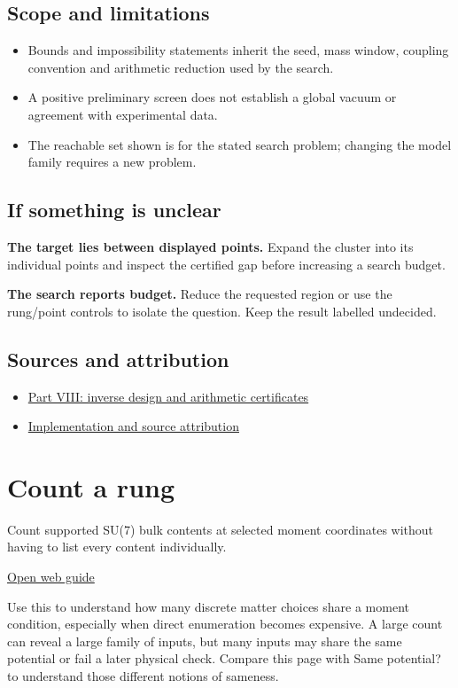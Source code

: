\documentclass[11pt,a4paper]{article}
\begin{document}
\subsection*{Scope and limitations}
\begin{itemize}
\item Bounds and impossibility statements inherit the seed, mass window, coupling convention and arithmetic reduction used by the search.
\item A positive preliminary screen does not establish a global vacuum or agreement with experimental data.
\item The reachable set shown is for the stated search problem; changing the model family requires a new problem.
\end{itemize}
\subsection*{If something is unclear}
\textbf{The target lies between displayed points.} Expand the cluster into its individual points and inspect the certified gap before increasing a search budget.

\textbf{The search reports budget.} Reduce the requested region or use the rung/point controls to isolate the question. Keep the result labelled undecided.

\subsection*{Sources and attribution}
\begin{itemize}
\item \href{https://karlesmarin.github.io/ghu-explorer/papers/part-viii/index.html}{Part VIII: inverse design and arithmetic certificates}
\item \href{https://github.com/karlesmarin/ghu-lab/blob/main/src/sections/inverse_section.js}{Implementation and source attribution}
\end{itemize}
\section{Count a rung}
Count supported SU(7) bulk contents at selected moment coordinates without having to list every content individually.

\href{https://karlesmarin.github.io/ghu-explorer/guide/census/index.html}{Open web guide}

Use this to understand how many discrete matter choices share a moment condition, especially when direct enumeration becomes expensive. A large count can reveal a large family of inputs, but many inputs may share the same potential or fail a later physical check. Compare this page with Same potential? to understand those different notions of sameness.
\end{document}
